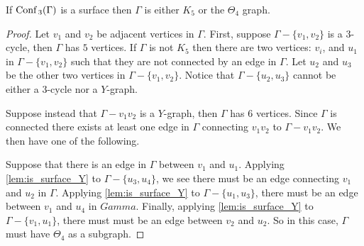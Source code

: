 \begin{thm}
    If \(\text{Conf}\,_3(\Gamma)\) is a surface then \(\Gamma\) is either \(K_5\) or the \(\Theta_4\) graph.
\end{thm}
\begin{proof}
    Let \(v_1\) and \(v_2\) be adjacent vertices in \(\Gamma\).
    First, suppose \(\Gamma - \{v_1, v_2\}\) is a \(3\)-cycle, then \(\Gamma\) has \(5\) vertices.
    If \(\Gamma\) is not \(K_5\) then there are two vertices: \(v_i\), and \(u_1\) in \(\Gamma - \{v_1, v_2\}\)
    such that they are not connected by an edge in \(\Gamma\).
    Let \(u_2\) and \(u_3\) be the other two vertices in \(\Gamma - \{v_1, v_2\}\).
    Notice that \(\Gamma - \{u_2, u_3\}\) cannot be either a \(3\)-cycle nor a \(Y\)-graph.

    Suppose instead that \(\Gamma - v_1 v_2\) is a \(Y\)-graph, then \(\Gamma\) has \(6\) vertices.
    Since \(\Gamma\) is connected there exists at least one edge in \(\Gamma\) connecting \(v_1 v_2\) to \(\Gamma - v_1 v_2\).
    We then have one of the following.
    \begin{figure}
        \centering
        \quad
    \end{figure}

    Suppose that there is an edge in \(\Gamma\) between \(v_1\) and \(u_1\).
    Applying \ref{lem:is_surface_Y} to \(\Gamma - \{u_3, u_4\}\), we see there must be an edge
    connecting \(v_1\) and \(u_2\) in \(\Gamma\).
    Applying \ref{lem:is_surface_Y} to \(\Gamma - \{u_1, u_3\}\), there must be an edge between
    \(v_1\) and \(u_4\) in \(Gamma\).
    Finally, applying \ref{lem:is_surface_Y} to \(\Gamma - \{v_1, u_1\}\), there must must be
    an edge between \(v_2\) and \(u_2\).
    So in this case, \(\Gamma\) must have \(\Theta_4\) as a subgraph.


\end{proof}
